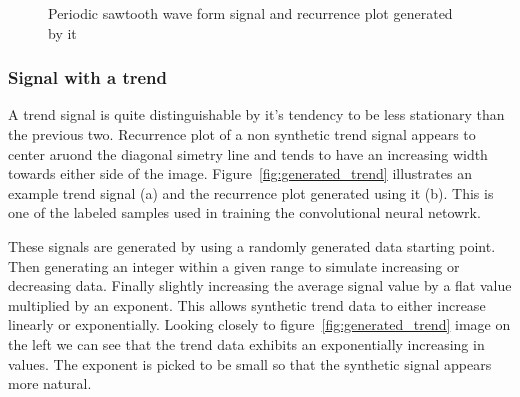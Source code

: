 \documentclass[a4paper,12pt,fleqn]{article}
\begin{document}
\begin{figure}
  \centering
  \qquad
  \caption{Periodic sawtooth wave form signal and recurrence plot generated by it}
  \label{fig:generated_periodic_sawtooth}
\end{figure}


\subsubsection{Signal with a trend}
A trend signal is quite distinguishable by it's tendency to be less stationary than the previous two.
Recurrence plot of a non synthetic trend signal appears to center aruond the diagonal simetry line and tends to have an increasing width towards either side of the image.
Figure~\ref{fig:generated_trend} illustrates an example trend signal (a) and the recurrence plot generated using it (b).
This is one of the labeled samples used in training the convolutional neural netowrk.

These signals are generated by using a randomly generated data starting point. Then generating an integer within a given range to simulate increasing or decreasing data.
Finally slightly increasing the average signal value by a flat value multiplied by an exponent.
This allows synthetic trend data to either increase linearly or exponentially.
Looking closely to figure~\ref{fig:generated_trend} image on the left we can see that the trend data exhibits an exponentially increasing in values.
The exponent is picked to be small so that the synthetic signal appears more 
natural.
\end{document}
